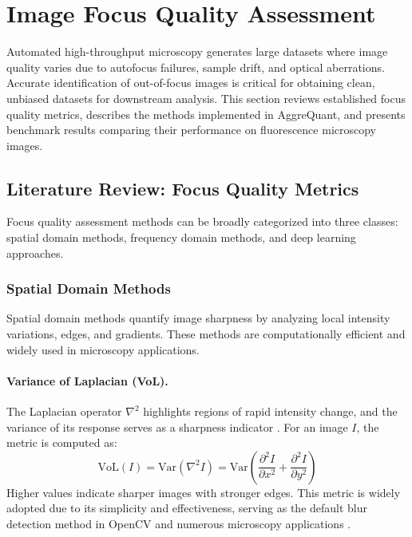 
\section{Image Focus Quality Assessment}
\label{sec:focus_quality}

Automated high-throughput microscopy generates large datasets where image quality varies due to autofocus failures, sample drift, and optical aberrations. Accurate identification of out-of-focus images is critical for obtaining clean, unbiased datasets for downstream analysis. This section reviews established focus quality metrics, describes the methods implemented in AggreQuant, and presents benchmark results comparing their performance on fluorescence microscopy images.

\subsection{Literature Review: Focus Quality Metrics}
\label{subsec:focus_literature}

Focus quality assessment methods can be broadly categorized into three classes: spatial domain methods, frequency domain methods, and deep learning approaches.

\subsubsection{Spatial Domain Methods}

Spatial domain methods quantify image sharpness by analyzing local intensity variations, edges, and gradients. These methods are computationally efficient and widely used in microscopy applications.

\paragraph{Variance of Laplacian (VoL).}
The Laplacian operator $\nabla^2$ highlights regions of rapid intensity change, and the variance of its response serves as a sharpness indicator \cite{pech2000diatom}. For an image $I$, the metric is computed as:
\begin{equation}
    \text{VoL}(I) = \text{Var}\left(\nabla^2 I\right) = \text{Var}\left(\frac{\partial^2 I}{\partial x^2} + \frac{\partial^2 I}{\partial y^2}\right)
\end{equation}
Higher values indicate sharper images with stronger edges. This metric is widely adopted due to its simplicity and effectiveness, serving as the default blur detection method in OpenCV and numerous microscopy applications \cite{pyimagesearch2015blur}.

